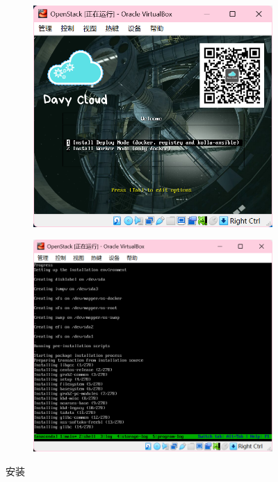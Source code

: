 \documentclass{article}
\begin{document}
\begin{figure}[H]
    \centering
    \begin{subfigure}[b]{0.45\textwidth}
        \includegraphics[width=\textwidth]{img/6.1.png}
    \end{subfigure}
    \begin{subfigure}[b]{0.45\textwidth}
        \includegraphics[width=\textwidth]{img/6.2.png}
    \end{subfigure}
    \caption{安装}
\end{figure}
\end{document}
